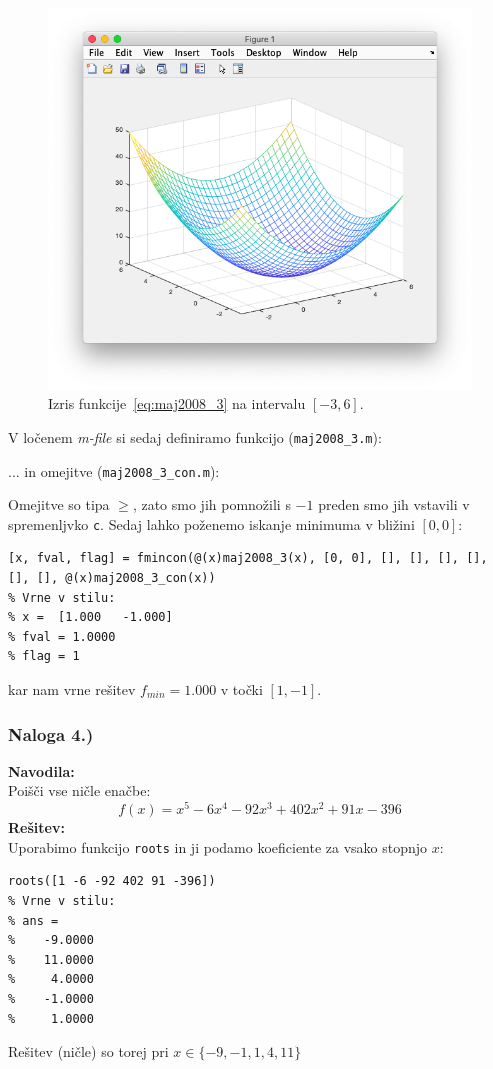 \documentclass[a4paper,11pt]{article}
\begin{document}
\begin{figure}[hbt]
\centering
\includegraphics[scale=.4]{images/maj2008_3_plot.png}
\caption{Izris funkcije~\ref{eq:maj2008_3} na intervalu $[-3, 6]$.}
\label{img:maj2008_3_plot}
\end{figure}

V ločenem \textit{m-file} si sedaj definiramo funkcijo (\texttt{maj2008\_3.m}):

... in omejitve (\texttt{maj2008\_3\_con.m}):

Omejitve so tipa $\geq$, zato smo jih pomnožili s $-1$ preden smo jih vstavili v spremenljvko \texttt{c}. Sedaj lahko poženemo iskanje minimuma v bližini $[0, 0]$:
\begin{lstlisting}
[x, fval, flag] = fmincon(@(x)maj2008_3(x), [0, 0], [], [], [], [], [], [], @(x)maj2008_3_con(x))
% Vrne v stilu:
% x =  [1.000   -1.000]
% fval = 1.0000
% flag = 1
\end{lstlisting}
kar nam vrne rešitev $f_{min} = 1.000$ v točki $[1, -1]$.


\subsubsection{Naloga 4.)}
\label{task:maj2008_4}

\textbf{Navodila:} \\
Poišči vse ničle enačbe:
\begin{equation} \label{eq:maj2008_4}
f(x) = x^5 -6x^4 - 92x^3 + 402x^2 + 91x - 396
\end{equation}
\textbf{Rešitev:} \\
Uporabimo funkcijo \texttt{roots} in ji podamo koeficiente za vsako stopnjo $x$:
\begin{lstlisting}
roots([1 -6 -92 402 91 -396])
% Vrne v stilu:
% ans =
%    -9.0000
%    11.0000
%     4.0000
%    -1.0000
%     1.0000
\end{lstlisting}
Rešitev (ničle) so torej pri $x \in \{-9, -1, 1, 4, 11\}$
\end{document}
